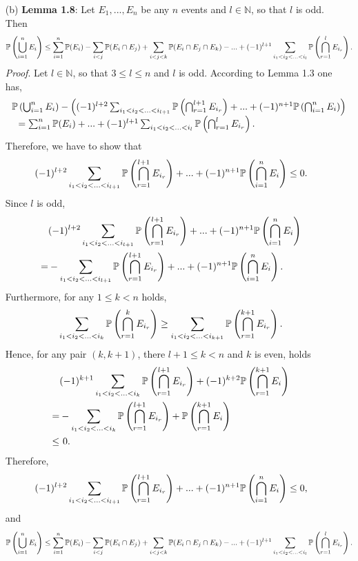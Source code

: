 \begin{enumerate}
  \item[(b)] \textbf{Lemma 1.8}: Let $E_1,...,E_n$ be any $n$ events and $l \in
  \mathbb{N}$, so that $l$ is odd. Then
  \[
    \mathbb{P}\left(\bigcup_{i=1}^n E_i\right)
    \leq \sum_{i=1}^n \mathbb{P}(E_i) - \sum_{i<j}\mathbb{P}(E_i \cap E_j) + \sum_{i<j<k}\mathbb{P}(E_i \cap E_j \cap E_k) - ... + (-1)^{l+1} \sum_{i_1<i_2< ... <i_l} \mathbb{P}\left(\bigcap_{r=1}^lE_{i_r}\right).
  \]
  \textit{Proof}. Let $l \in \mathbb{N}$, so that $3 \leq l \leq n$ and $l$ is odd. According to Lemma 1.3 one has,
  \begin{align*}
  \begin{tabular}{l}
    $\pr\left(\bigcup_{i=1}^n E_i\right) -
    \left(
      (-1)^{l+2} \sum_{i_1<i_2< ... <i_{l+1}} \pr\left(\bigcap_{r=1}^{l+1} E_{i_r}\right) + ... +
      (-1)^{n+1} \pr\left(\bigcap_{i=1}^n E_{i}\right)
    \right)$ \\
    $\ \ = \sum_{i=1}^n \pr(E_i) + ... + (-1)^{l+1} \sum_{i_1<i_2< ... <i_l}
      \pr\left(\bigcap_{r=1}^lE_{i_r}\right).$
  \end{tabular}
  \end{align*}
  Therefore, we have to show that
  \[
    (-1)^{l+2} \sum_{i_1<i_2< ... <i_{l+1}} \mathbb{P}\left(\bigcap_{r=1}^{l+1} E_{i_r}\right)
    + ... + (-1)^{n+1} \mathbb{P}\left(\bigcap_{i=1}^n E_{i}\right) \leq 0.
  \]
  Since $l$ is odd,
  \begin{align*}
      &(-1)^{l+2} \sum_{i_1<i_2< ... <i_{l+1}} \mathbb{P}\left(\bigcap_{r=1}^{l+1} E_{i_r}\right) + ... + (-1)^{n+1} \mathbb{P}\left(\bigcap_{i=1}^n E_{i}\right) \\
    = &-\sum_{i_1<i_2< ... <i_{l+1}} \mathbb{P}\left(\bigcap_{r=1}^{l+1} E_{i_r}\right)
      + ... + (-1)^{n+1} \mathbb{P}\left(\bigcap_{i=1}^n E_{i}\right).
  \end{align*}
  Furthermore, for any $1 \leq k < n$ holds,
  \[
    \sum_{i_1<i_2< ... <i_k} \mathbb{P}\left(\bigcap_{r=1}^k E_{i_r}\right)
    \geq \sum_{i_1<i_2< ... <i_{k+1}} \mathbb{P}\left(\bigcap_{r=1}^{k+1} E_{i_r}\right).
  \]
  Hence, for any pair $(k,k+1)$, there $l+1 \leq k < n$ and $k$ is even, holds
  \begin{align*}
    \   &(-1)^{k+1} \sum_{i_1<i_2< ... <i_{k}} \mathbb{P}\left(\bigcap_{r=1}^{l+1} E_{i_r}\right) + (-1)^{k+2} \mathbb{P}\left( \bigcap_{r=1}^{k+1} E_{i} \right) \\
    =   &-\sum_{i_1<i_2< ... <i_k} \mathbb{P}\left( \bigcap_{r=1}^{l+1} E_{i_r} \right) + \mathbb{P}\left(\bigcap_{r=1}^{k+1} E_{i}\right) \\
    \leq &\ 0.
  \end{align*}
  Therefore,
  \[
    (-1)^{l+2} \sum_{i_1<i_2< ... <i_{l+1}} \mathbb{P}\left(\bigcap_{r=1}^{l+1} E_{i_r}\right)
    + ... + (-1)^{n+1} \mathbb{P}\left(\bigcap_{i=1}^n E_{i}\right) \leq 0,
  \]
  and
  \[
    \mathbb{P}\left(\bigcup_{i=1}^n E_i\right)
    \leq \sum_{i=1}^n \mathbb{P}(E_i) - \sum_{i<j}\mathbb{P}(E_i \cap E_j) + \sum_{i<j<k}\mathbb{P}(E_i \cap E_j \cap E_k) - ... + (-1)^{l+1} \sum_{i_1<i_2< ... <i_l} \mathbb{P}\left(\bigcap_{r=1}^lE_{i_r}\right).
  \]


\end{enumerate}
